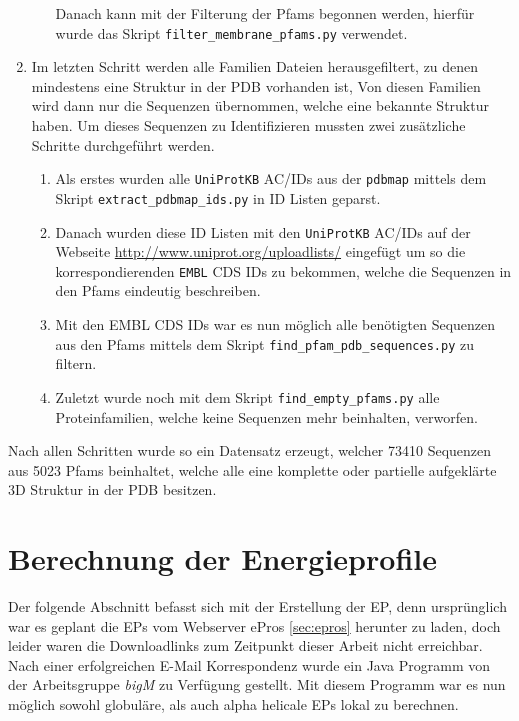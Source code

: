 \begin{enumerate}
\begin{enumerate}
        Danach kann mit der Filterung der \ac{Pfams} begonnen werden, hierfür wurde das Skript \texttt{filter\_membrane\_pfams.py} verwendet.
    \end{enumerate}
\item
    Im letzten Schritt werden alle Familien Dateien herausgefiltert, zu denen mindestens eine Struktur in der \ac{PDB} vorhanden ist, Von diesen Familien wird dann nur die Sequenzen übernommen, welche eine bekannte Struktur haben. Um dieses Sequenzen zu Identifizieren mussten zwei zusätzliche Schritte durchgeführt werden.
    \begin{enumerate}
        \item
        Als erstes wurden alle \texttt{UniProtKB} AC/IDs aus der \texttt{pdbmap} mittels dem Skript \texttt{extract\_pdbmap\_ids.py} in ID Listen geparst. 
        \item
        Danach wurden diese ID Listen mit den \texttt{UniProtKB} AC/IDs auf der Webseite \url{http://www.uniprot.org/uploadlists/} eingefügt um so die korrespondierenden \texttt{EMBL} CDS IDs zu bekommen, welche die Sequenzen in den Pfams eindeutig beschreiben.
        \item
        Mit den EMBL CDS IDs war es nun möglich alle benötigten Sequenzen aus den Pfams mittels dem Skript \texttt{find\-\_pfam\-\_pdb\-\_sequences.py} zu filtern.
        \item
        Zuletzt wurde noch mit dem Skript \texttt{find\-\_empty\-\_pfams.py} alle Proteinfamilien, welche keine Sequenzen mehr beinhalten, verworfen. 
    \end{enumerate}
\end{enumerate}

Nach allen Schritten wurde so ein Datensatz erzeugt, welcher 73410 Sequenzen aus 5023 \ac{Pfams} beinhaltet, welche alle eine komplette oder partielle aufgeklärte 3D Struktur in der \ac{PDB} besitzen.




\section{Berechnung der Energieprofile}
\label{sec:calc_ep}
Der folgende Abschnitt befasst sich mit der Erstellung der \acf{EP}, denn ursprünglich war es geplant die \ac{EPs}  vom Webserver ePros \ref{sec:epros} herunter zu laden, doch leider waren die Downloadlinks zum Zeitpunkt dieser Arbeit nicht erreichbar. Nach einer erfolgreichen E-Mail Korrespondenz wurde ein Java Programm von der Arbeitsgruppe \emph{bigM} zu Verfügung gestellt. Mit diesem Programm war es nun möglich sowohl globuläre, als auch alpha helicale \ac{EPs}  lokal zu berechnen. 

